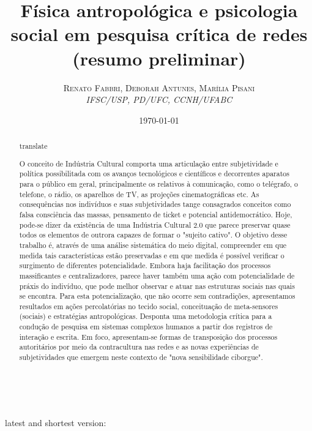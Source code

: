 \documentclass[a4paper, 11pt]{article} %
\title{\textbf{Física antropológica e psicologia social em pesquisa crítica de redes}\\ %
(resumo preliminar)} %
\author{\textsc{Renato Fabbri, Deborah Antunes, Marília Pisani} %
\\{\textit{IFSC/USP, PD/UFC, CCNH/UFABC}}} %
\date{\today} %
\makeatletter
\renewcommand{\maketitle}{ %
\begin{flushright} %
{\LARGE\@title} %

\vspace{50pt} %

{\large\@author} %
\\\@date %

\vspace{40pt} %
\end{flushright}
}
\makeatother
\begin{document}
\maketitle %




{
\begin{abstract}
	translate
\end{abstract}
}

latest and shortest version:
\begin{abstract}
	O conceito de Indústria Cultural comporta uma articulação entre subjetividade e política possibilitada com os avanços tecnológicos e científicos e decorrentes aparatos para o público em geral, principalmente os relativos à comunicação, como o telégrafo, o telefone, o rádio, os aparelhos de TV, as projeções cinematográficas etc.
	As consequências nos indivíduos e suas subjetividades  tange consagrados conceitos como falsa consciência das massas, pensamento de ticket e potencial antidemocrático. Hoje, pode-se dizer da existência de uma Indústria Cultural 2.0 que parece preservar quase todos os elementos de outrora capazes de formar o "sujeito cativo".
	O objetivo desse trabalho é, através de uma análise sistemática do meio digital, compreender em que medida tais características estão preservadas e em que medida é possível verificar o surgimento de diferentes potencialidade.
	Embora haja facilitação dos processos massificantes e centralizadores, parece haver também uma ação com potencialidade de práxis do indivíduo, que pode melhor observar e atuar nas estruturas sociais nas quais se encontra. Para esta potencialização, que não ocorre sem contradições, apresentamos resultados em ações percolatórias no
	 tecido social, conceituação de meta-sensores (sociais) e estratégias antropológicas.
	 Desponta uma metodologia crítica para a condução de pesquisa em sistemas complexos humanos a partir dos registros de interação e escrita.
	 Em foco, apresentam-se formas de transposição dos processos autoritários por meio da contracultura nas redes e as novas experiências de subjetividades que emergem neste contexto de "nova sensibilidade ciborgue".
\end{abstract}
\end{document}
